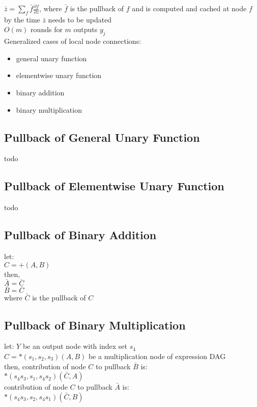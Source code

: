 \documentclass[8pt]{extarticle}
\begin{document}
\begin{multicols*}{2}
  $\bar{z} = \sum_f \bar{f} \frac{\partial f}{\partial z}$, where $\bar{f}$ is the pullback of $f$ and is computed and cached at node $f$ by the time $\bar{z}$ needs to be updated\\
  
  $O(m)$ rounds for $m$ outputs $y_j$\\

  Generalized cases of local node connections:
  \begin{itemize}
  \item general unary function
  \item elementwise unary function
  \item binary addition
  \item binary multiplication
  \end{itemize}

    \vfill\null
    \columnbreak
    
  \subsection{Pullback of General Unary Function}
  todo

  \vfill\null
  \columnbreak
    
  \subsection{Pullback of Elementwise Unary Function}
  todo
  
  \vfill\null
  \columnbreak
  
  \subsection{Pullback of Binary Addition}
  let:\\
  $C = +(A,B)$\\
  then,\\
  $\bar{A} = \bar{C}$\\
  $\bar{B} = \bar{C}$\\
  where $\bar{C}$ is the pullback of $C$

  \vfill\null
  \columnbreak
  
  \subsection{Pullback of Binary Multiplication}
  let:
  $Y$ be an output node with index set $s_4$\\
  $C = *(s_1, s_2, s_3)(A, B)$ be a multiplication node of expression DAG\\
  then, contribution of node $C$ to pullback $\bar{B}$ is:\\
  $*(s_4 s_3, s_1, s_4 s_2)(\bar{C}, A)$\\
  contribution of node $C$ to pullback $\bar{A}$ is:\\
  $*(s_4 s_3, s_2, s_4 s_1)(\bar{C}, B)$


\end{multicols*}
\end{document}
